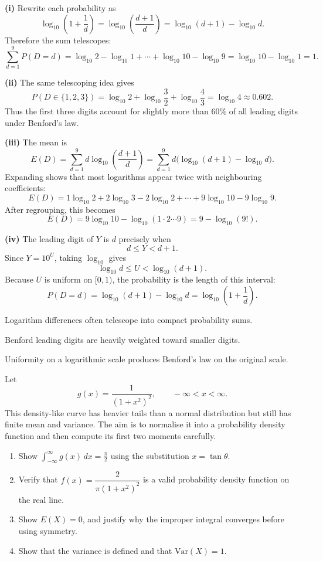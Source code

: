 \begin{solution}
\textbf{(i)} Rewrite each probability as
\[
\log_{10}\!\left(1+\frac1d\right)
=\log_{10}\!\left(\frac{d+1}{d}\right)
=\log_{10}(d+1)-\log_{10}d.
\]
Therefore the sum telescopes:
\[
\sum_{d=1}^{9}P(D=d)
=\log_{10}2-\log_{10}1+\cdots+\log_{10}10-\log_{10}9
=\log_{10}10-\log_{10}1=1.
\]

\textbf{(ii)} The same telescoping idea gives
\[
P(D\in\{1,2,3\})=\log_{10}2+\log_{10}\frac32+\log_{10}\frac43
=\log_{10}4\approx0{.}602.
\]
Thus the first three digits account for slightly more than $60\%$ of all leading digits under Benford's law.

\textbf{(iii)} The mean is
\[
E(D)=\sum_{d=1}^{9}d\log_{10}\!\left(\frac{d+1}{d}\right)
=\sum_{d=1}^{9}d\bigl(\log_{10}(d+1)-\log_{10}d\bigr).
\]
Expanding shows that most logarithms appear twice with neighbouring coefficients:
\[
E(D)=1\log_{10}2+2\log_{10}3-2\log_{10}2+\cdots+9\log_{10}10-9\log_{10}9.
\]
After regrouping, this becomes
\[
E(D)=9\log_{10}10-\log_{10}(1\cdot2\cdots9)
=9-\log_{10}(9!).
\]

\textbf{(iv)} The leading digit of $Y$ is $d$ precisely when
\[
d\le Y<d+1.
\]
Since $Y=10^U$, taking $\log_{10}$ gives
\[
\log_{10}d\le U<\log_{10}(d+1).
\]
Because $U$ is uniform on $[0,1)$, the probability is the length of this interval:
\[
P(D=d)=\log_{10}(d+1)-\log_{10}d
=\log_{10}\!\left(1+\frac1d\right).
\]
\end{solution}

\begin{takeaways}
\item Logarithm differences often telescope into compact probability sums.
\item Benford leading digits are heavily weighted toward smaller digits.
\item Uniformity on a logarithmic scale produces Benford's law on the original scale.
\end{takeaways}

\begin{problem}
Let
\[
g(x)=\frac{1}{(1+x^2)^2},\qquad -\infty<x<\infty.
\]
This density-like curve has heavier tails than a normal distribution but still has finite mean and variance. The aim is to normalise it into a probability density function and then compute its first two moments carefully.
\begin{enumerate}[label=\textbf{(\roman*)}]
\item Show $\displaystyle\int_{-\infty}^{\infty}g(x)\,dx=\frac{\pi}{2}$ using the substitution $x=\tan\theta$.
\item Verify that $f(x)=\dfrac{2}{\pi(1+x^2)^2}$ is a valid probability density function on the real line.
\item Show $E(X)=0$, and justify why the improper integral converges before using symmetry.
\item Show that the variance is defined and that $\mathrm{Var}(X)=1$.
\end{enumerate}
\end{problem}

